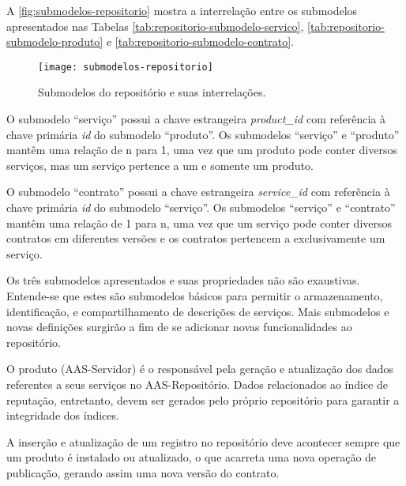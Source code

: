 A \autoref{fig:submodelos-repositorio} mostra a interrelação entre os submodelos apresentados nas Tabelas \ref{tab:repositorio-submodelo-servico}, \ref{tab:repositorio-submodelo-produto} e \ref{tab:repositorio-submodelo-contrato}.

\begin{figure}[htb!]
	\centering
	\texttt{[image: submodelos-repositorio]}
	\caption{Submodelos do repositório e suas interrelações.}
	\label{fig:submodelos-repositorio}
\end{figure}

O submodelo ``serviço'' possui a chave estrangeira \textit{product\_id} com referência à chave primária \textit{id} do submodelo ``produto''. Os submodelos ``serviço'' e ``produto'' mantêm uma relação de n para 1, uma vez que um produto pode conter diversos serviços, mas um serviço pertence a um e somente um produto.

O submodelo ``contrato'' possui a chave estrangeira \textit{service\_id} com referência à chave primária \textit{id} do submodelo ``serviço''. Os submodelos ``serviço'' e ``contrato'' mantêm uma relação de 1 para n, uma vez que um serviço pode conter diversos contratos em diferentes versões e os contratos pertencem a exclusivamente um serviço.

Os três submodelos apresentados e suas propriedades não são exaustivas. Entende-se que estes são submodelos básicos para permitir o armazenamento, identificação, e compartilhamento de descrições de serviços. Mais submodelos e novas definições surgirão a fim de se adicionar novas funcionalidades ao repositório.


O produto (AAS-Servidor) é o responsável pela geração e atualização dos dados referentes a seus serviços no AAS-Repositório. Dados relacionados ao índice de reputação, entretanto, devem ser gerados pelo próprio repositório para garantir a integridade dos índices.

A inserção e atualização de um registro no repositório deve acontecer sempre que um produto é instalado ou atualizado, o que acarreta uma nova operação de publicação, gerando assim uma nova versão do contrato.


